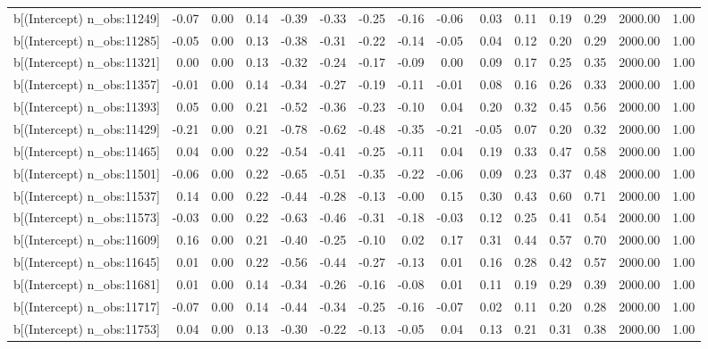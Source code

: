\begin{table}[ht]
\begin{tabular}{rrrrrrrrrrrrrrr}
  b[(Intercept) n\_obs:11249] & -0.07 & 0.00 & 0.14 & -0.39 & -0.33 & -0.25 & -0.16 & -0.06 & 0.03 & 0.11 & 0.19 & 0.29 & 2000.00 & 1.00 \\ 
  b[(Intercept) n\_obs:11285] & -0.05 & 0.00 & 0.13 & -0.38 & -0.31 & -0.22 & -0.14 & -0.05 & 0.04 & 0.12 & 0.20 & 0.29 & 2000.00 & 1.00 \\ 
  b[(Intercept) n\_obs:11321] & 0.00 & 0.00 & 0.13 & -0.32 & -0.24 & -0.17 & -0.09 & 0.00 & 0.09 & 0.17 & 0.25 & 0.35 & 2000.00 & 1.00 \\ 
  b[(Intercept) n\_obs:11357] & -0.01 & 0.00 & 0.14 & -0.34 & -0.27 & -0.19 & -0.11 & -0.01 & 0.08 & 0.16 & 0.26 & 0.33 & 2000.00 & 1.00 \\ 
  b[(Intercept) n\_obs:11393] & 0.05 & 0.00 & 0.21 & -0.52 & -0.36 & -0.23 & -0.10 & 0.04 & 0.20 & 0.32 & 0.45 & 0.56 & 2000.00 & 1.00 \\ 
  b[(Intercept) n\_obs:11429] & -0.21 & 0.00 & 0.21 & -0.78 & -0.62 & -0.48 & -0.35 & -0.21 & -0.05 & 0.07 & 0.20 & 0.32 & 2000.00 & 1.00 \\ 
  b[(Intercept) n\_obs:11465] & 0.04 & 0.00 & 0.22 & -0.54 & -0.41 & -0.25 & -0.11 & 0.04 & 0.19 & 0.33 & 0.47 & 0.58 & 2000.00 & 1.00 \\ 
  b[(Intercept) n\_obs:11501] & -0.06 & 0.00 & 0.22 & -0.65 & -0.51 & -0.35 & -0.22 & -0.06 & 0.09 & 0.23 & 0.37 & 0.48 & 2000.00 & 1.00 \\ 
  b[(Intercept) n\_obs:11537] & 0.14 & 0.00 & 0.22 & -0.44 & -0.28 & -0.13 & -0.00 & 0.15 & 0.30 & 0.43 & 0.60 & 0.71 & 2000.00 & 1.00 \\ 
  b[(Intercept) n\_obs:11573] & -0.03 & 0.00 & 0.22 & -0.63 & -0.46 & -0.31 & -0.18 & -0.03 & 0.12 & 0.25 & 0.41 & 0.54 & 2000.00 & 1.00 \\ 
  b[(Intercept) n\_obs:11609] & 0.16 & 0.00 & 0.21 & -0.40 & -0.25 & -0.10 & 0.02 & 0.17 & 0.31 & 0.44 & 0.57 & 0.70 & 2000.00 & 1.00 \\ 
  b[(Intercept) n\_obs:11645] & 0.01 & 0.00 & 0.22 & -0.56 & -0.44 & -0.27 & -0.13 & 0.01 & 0.16 & 0.28 & 0.42 & 0.57 & 2000.00 & 1.00 \\ 
  b[(Intercept) n\_obs:11681] & 0.01 & 0.00 & 0.14 & -0.34 & -0.26 & -0.16 & -0.08 & 0.01 & 0.11 & 0.19 & 0.29 & 0.39 & 2000.00 & 1.00 \\ 
  b[(Intercept) n\_obs:11717] & -0.07 & 0.00 & 0.14 & -0.44 & -0.34 & -0.25 & -0.16 & -0.07 & 0.02 & 0.11 & 0.20 & 0.28 & 2000.00 & 1.00 \\ 
  b[(Intercept) n\_obs:11753] & 0.04 & 0.00 & 0.13 & -0.30 & -0.22 & -0.13 & -0.05 & 0.04 & 0.13 & 0.21 & 0.31 & 0.38 & 2000.00 & 1.00 \\ 

\end{tabular}
\end{table}
